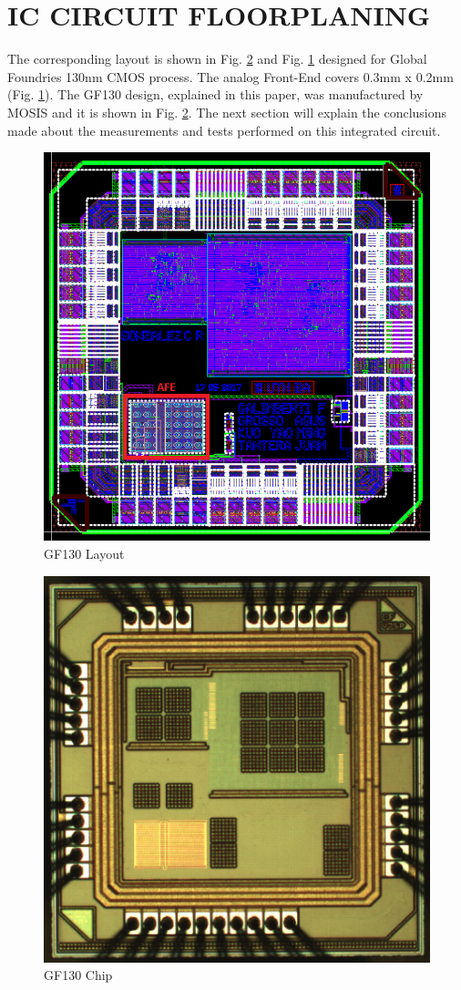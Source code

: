 \documentclass[a4paper, 10pt, conference]{ieeeconf}      %
\begin{document}
\section{IC CIRCUIT FLOORPLANING}

The corresponding layout is shown in Fig. \ref{fig:chip GF130} and Fig. \ref{fig:layout GF130}
designed for Global Foundries 130nm CMOS process. The
analog Front-End covers 0.3mm x 0.2mm (Fig. \ref{fig:layout GF130}).
The GF130 design, explained in this paper, was
manufactured by MOSIS \cite{mosis} and it is shown in Fig. \ref{fig:chip GF130}. The
next section will explain the conclusions made about the measurements and tests performed on this integrated circuit.


\begin{figure}[H]
    \centering
    \includegraphics[width=0.5\linewidth]{Images/ImagenesTesina/circuitos/gf130_layout.png}
    \caption{GF130 Layout}
    \label{fig:layout GF130}
\end{figure}

\begin{figure}[H]
    \centering
    \includegraphics[width=0.5\linewidth]{Images/ImagenesTesina/chip_130.png}
    \caption{GF130 Chip}
    \label{fig:chip GF130}
\end{figure}
\end{document}
